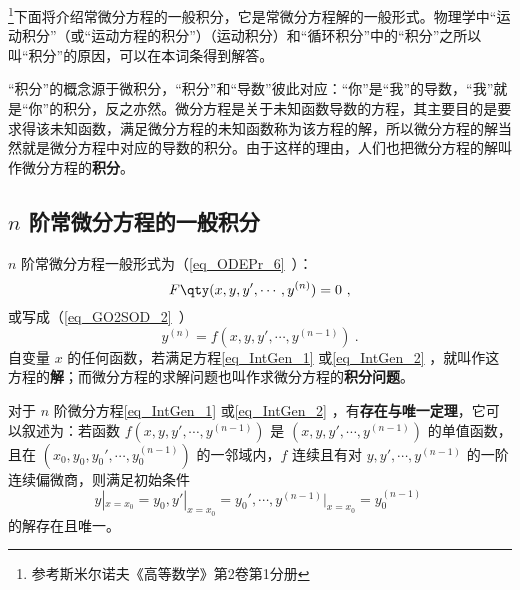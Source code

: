 \footnote{参考斯米尔诺夫《高等数学》第2卷第1分册}下面将介绍常微分方程的一般积分，它是常微分方程解的一般形式。物理学中“运动积分”（或“运动方程的积分”）（运动积分）和“循环积分”中的“积分”之所以叫“积分”的原因，可以在本词条得到解答。

“积分”的概念源于微积分，“积分”和“导数”彼此对应：“你”是“我”的导数，“我”就是“你”的积分，反之亦然。微分方程是关于未知函数导数的方程，其主要目的是要求得该未知函数，满足微分方程的未知函数称为该方程的解，所以微分方程的解当然就是微分方程中对应的导数的积分。由于这样的理由，人们也把微分方程的解叫作微分方程的\textbf{积分}。
\subsection{$n$ 阶常微分方程的一般积分}
$n$ 阶常微分方程一般形式为（\autoref{eq_ODEPr_6}~）：
\begin{equation}\label{eq_IntGen_1}
F \qty(x,y,y',\cdots,y^{(n)}) =0~,
\end{equation}
或写成（\autoref{eq_GO2SOD_2}~）
\begin{equation}\label{eq_IntGen_2}
y^{(n)}=f(x,y,y',\cdots,y^{(n-1)})~.
\end{equation}
自变量 $x$ 的任何函数，若满足方程\autoref{eq_IntGen_1} 或\autoref{eq_IntGen_2} ，就叫作这方程的\textbf{解}；而微分方程的求解问题也叫作求微分方程的\textbf{积分问题}。

对于 $n$ 阶微分方程\autoref{eq_IntGen_1} 或\autoref{eq_IntGen_2} ，有\textbf{存在与唯一定理}，它可以叙述为：若函数 $f(x,y,y',\cdots,y^{(n-1)})$ 是 $(x,y,y',\cdots,y^{(n-1)})$ 的单值函数，且在 $(x_0,y_0,y_0',\cdots,y_0^{(n-1)})$ 的一邻域内，$f$ 连续且有对 $y,y',\cdots,y^{(n-1)}$ 的一阶连续偏微商，则满足初始条件
\begin{equation}\label{eq_IntGen_5}
y|_{x=x_0}=y_0,y'|_{x=x_0}=y_0',\cdots,y^{(n-1)}|_{x=x_0}=y_0^{(n-1)}~
\end{equation}
的解存在且唯一。

